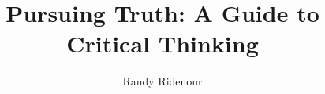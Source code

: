 \documentclass[letterpaper,12pt,oneside,onecolumn]{memoir}
\title{Pursuing Truth: A Guide to Critical Thinking}
\author{Randy Ridenour}
\begin{document}
\frontmatter

\begin{titlingpage}
  \maketitle
\end{titlingpage}
  


\tableofcontents*



\mainmatter





\end{document}
